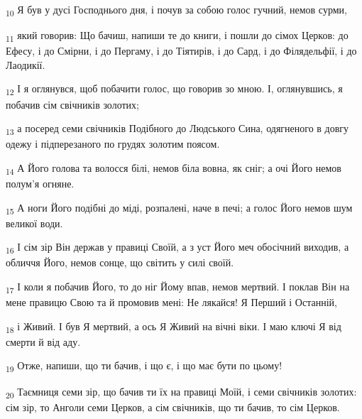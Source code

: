 \begin{tcolorbox}
\textsubscript{10} Я був у дусі Господнього дня, і почув за собою голос гучний, немов сурми,
\end{tcolorbox}
\begin{tcolorbox}
\textsubscript{11} який говорив: Що бачиш, напиши те до книги, і пошли до сімох Церков: до Ефесу, і до Смірни, і до Пергаму, і до Тіятирів, і до Сард, і до Філядельфії, і до Лаодикії.
\end{tcolorbox}
\begin{tcolorbox}
\textsubscript{12} І я оглянувся, щоб побачити голос, що говорив зо мною. І, оглянувшись, я побачив сім свічників золотих;
\end{tcolorbox}
\begin{tcolorbox}
\textsubscript{13} а посеред семи свічників Подібного до Людського Сина, одягненого в довгу одежу і підперезаного по грудях золотим поясом.
\end{tcolorbox}
\begin{tcolorbox}
\textsubscript{14} А Його голова та волосся білі, немов біла вовна, як сніг; а очі Його немов полум'я огняне.
\end{tcolorbox}
\begin{tcolorbox}
\textsubscript{15} А ноги Його подібні до міді, розпалені, наче в печі; а голос Його немов шум великої води.
\end{tcolorbox}
\begin{tcolorbox}
\textsubscript{16} І сім зір Він держав у правиці Своїй, а з уст Його меч обосічний виходив, а обличчя Його, немов сонце, що світить у силі своїй.
\end{tcolorbox}
\begin{tcolorbox}
\textsubscript{17} І коли я побачив Його, то до ніг Йому впав, немов мертвий. І поклав Він на мене правицю Свою та й промовив мені: Не лякайся! Я Перший і Останній,
\end{tcolorbox}
\begin{tcolorbox}
\textsubscript{18} і Живий. І був Я мертвий, а ось Я Живий на вічні віки. І маю ключі Я від смерти й від аду.
\end{tcolorbox}
\begin{tcolorbox}
\textsubscript{19} Отже, напиши, що ти бачив, і що є, і що має бути по цьому!
\end{tcolorbox}
\begin{tcolorbox}
\textsubscript{20} Таємниця семи зір, що бачив ти їх на правиці Моїй, і семи свічників золотих: сім зір, то Анголи семи Церков, а сім свічників, що ти бачив, то сім Церков.
\end{tcolorbox}

